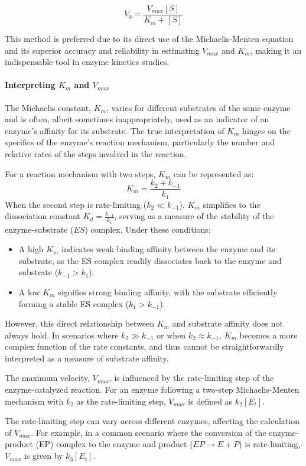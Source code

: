 $$
V_0 = \frac{V_{max}[S]}{K_m + [S]}
$$

This method is preferred due to its direct use of the Michaelis-Menten equation and its superior 
accuracy and reliability in estimating $V_{max}$ and $K_m$, making it an indispensable tool in 
enzyme kinetics studies.

\paragraph{Interpreting \(K_m\) and \(V_{max}\)}

The Michaelis constant, $K_m$, varies for different substrates of the same enzyme and is often, 
albeit sometimes inappropriately, used as an indicator of an enzyme's affinity for its substrate. 
The true interpretation of $K_m$ hinges on the specifics of the enzyme's reaction mechanism, 
particularly the number and relative rates of the steps involved in the reaction.

For a reaction mechanism with two steps, $K_m$ can be represented as:
$$
K_m = \frac{k_2 + k_{-1}}{k_1}
$$
When the second step is rate-limiting ($k_2 \ll k_{-1}$), $K_m$ simplifies to the dissociation 
constant $K_d = \frac{k_{-1}}{k_1}$, serving as a measure of the stability of the enzyme-substrate 
($ES$) complex. Under these conditions:
\begin{itemize}
    \item A high $K_m$ indicates weak binding affinity between the enzyme and its substrate, 
    as the ES complex readily dissociates back to the enzyme and substrate ($k_{-1} > k_1$).
    \item A low $K_m$ signifies strong binding affinity, with the substrate efficiently 
    forming a stable ES complex ($k_1 > k_{-1}$).
\end{itemize}

However, this direct relationship between $K_m$ and substrate affinity does not always hold. 
In scenarios where $k_2 \gg k_{-1}$ or when $k_2 \approx k_{-1}$, $K_m$ becomes a more complex 
function of the rate constants, and thus cannot be straightforwardly interpreted as a measure of 
substrate affinity.

The maximum velocity, $V_{max}$, is influenced by the rate-limiting step of the enzyme-catalyzed reaction. 
For an enzyme following a two-step Michaelis-Menten mechanism with $k_2$ as the rate-limiting step, 
$V_{max}$ is defined as $k_2[E_t]$.

The rate-limiting step can vary across different enzymes, affecting the calculation of $V_{max}$. 
For example, in a common scenario where the conversion of the enzyme-product (EP) complex to the 
enzyme and product ($EP \rightarrow E + P$) is rate-limiting, $V_{max}$ is given by $k_3[E_t]$.

